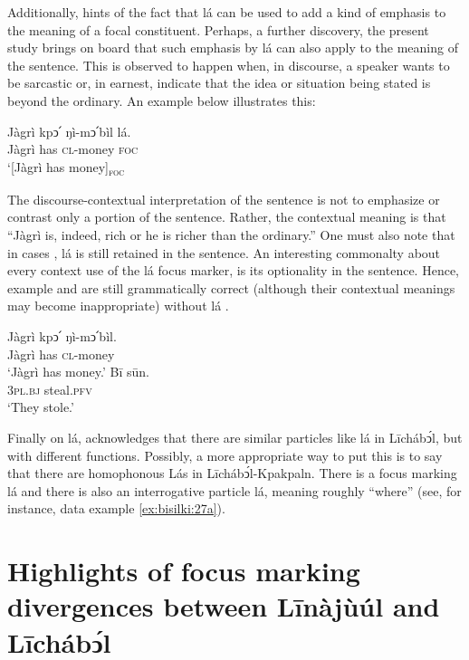 \documentclass[output=paper,colorlinks,citecolor=brown]{langscibook}
\begin{document}
Additionally, \citet{Schwarz2009} hints of the fact that lá can be used to add a kind of emphasis to the meaning of a focal constituent. Perhaps, a further discovery, the present study brings on board that such emphasis by lá can also apply to the meaning of the sentence. This is observed to happen when, in discourse, a speaker wants to be sarcastic or, in earnest, indicate that the idea or situation being stated is beyond the ordinary. An example  below illustrates this:

\ea%
    \label{ex:bisilki:28}
    \gll    Jàgrì	kpↄ՛	ŋì-mↄ՛bìl	lá.\\
            Jàgrì	has	\textsc{cl-}money	\textsc{foc}\\
    \glt    ‘[Jàgrì has money]\textsubscript{\textsc{foc}}
\z

The discourse-contextual interpretation of the sentence  is not to emphasize or contrast only a portion of the sentence. Rather, the contextual meaning is that “Jàgrì is, indeed, rich or he is richer than the ordinary.” One must also note that in cases , lá is still retained in the sentence. An interesting commonalty about every context use of the lá focus marker, is its optionality in the sentence. Hence, example  and  are still grammatically correct (although their contextual meanings may become inappropriate) without lá .

\ea%
    \label{ex:bisilki:29}
    \ea\label{ex:bisilki:29a}
    \gll    Jàgrì	kpↄ՛	ŋì-mↄ՛bìl.\\
            Jàgrì	has	\textsc{cl-}money\\
    \glt    ‘Jàgrì has money.’
    \ex\label{ex:bisilki:29b}
    \gll    Bī		sūn.\\
            \textsc{3pl.bj}		steal\textsc{.pfv}\\
    \glt    ‘They stole.’
    \z
\z

Finally on lá, \citet{Schwarz2009} acknowledges that there are similar particles like lá in Līchábͻ́l, but with different functions. Possibly, a more appropriate way to put this is to say that there are homophonous Lás in Līchábͻ́l-Kpakpaln. There is a focus marking lá and there is also an interrogative particle lá, meaning roughly “where” (see, for instance, data example \ref{ex:bisilki:27a}).

\section{Highlights of focus marking divergences between Līnàjùúl and Līchábͻ́l
}\label{sec:bisilki:8}
\end{document}
